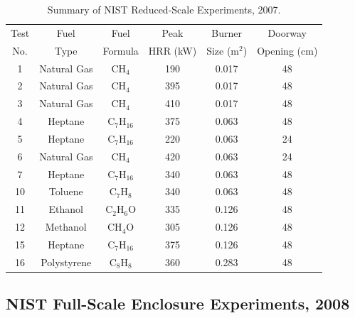 \begin{table}[!ht]
\centering
\caption[Summary of NIST Reduced-Scale Experiments, 2007]{Summary of NIST Reduced-Scale Experiments, 2007.}
\begin{tabular}{|c|c|c|c|c|c|}
\hline
Test   &  Fuel         &  Fuel           & Peak        &  Burner       &  Doorway          \\
No.    &  Type         &  Formula        & HRR (kW)    &  Size (m$^2$) &  Opening (cm)     \\ \hline \hline
1      &  Natural Gas  &  CH$_4$         & 190         &  0.017        &  48               \\ \hline
2      &  Natural Gas  &  CH$_4$         & 395         &  0.017        &  48               \\ \hline
3      &  Natural Gas  &  CH$_4$         & 410         &  0.017        &  48               \\ \hline
4      &  Heptane      &  C$_7$H$_{16}$  & 375         &  0.063        &  48               \\ \hline
5      &  Heptane      &  C$_7$H$_{16}$  & 220         &  0.063        &  24               \\ \hline
6      &  Natural Gas  &  CH$_4$         & 420         &  0.063        &  24               \\ \hline
7      &  Heptane      &  C$_7$H$_{16}$  & 340         &  0.063        &  48               \\ \hline
10     &  Toluene      &  C$_7$H$_8$     & 340         &  0.063        &  48               \\ \hline
11     &  Ethanol      &  C$_2$H$_6$O    & 335         &  0.126        &  48               \\ \hline
12     &  Methanol     &  CH$_4$O        & 305         &  0.126        &  48               \\ \hline
15     &  Heptane      &  C$_7$H$_{16}$  & 375         &  0.126        &  48               \\ \hline
16     &  Polystyrene  &  C$_8$H$_8$     & 360         &  0.283        &  48               \\ \hline
\end{tabular}
\label{tab:NIST_RSE_Exp}
\end{table}


\subsection{NIST Full-Scale Enclosure Experiments, 2008}
\label{NIST_FSE_2008_Description}

